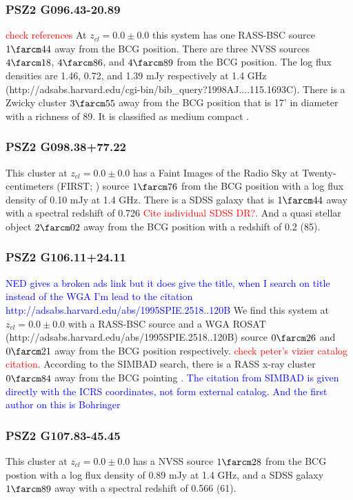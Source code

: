 \documentclass[apj, revtex4-1]{emulateapj}
\newcommand{\editorial}[1]{\textcolor{red}{#1}}
\newcommand{\peditorial}[1]{\textcolor{blue}{#1}}
\begin{document}
\subsubsection{PSZ2 G096.43-20.89}
\editorial{check references}
At $z_{cl} = 0.0 \pm 0.0$ this system has one RASS-BSC source $1\farcm44$ away from the BCG position. There are three NVSS sources $4\farcm18$, $4\farcm86$, and $4\farcm89$ from the BCG position. The log flux densities are 1.46, 0.72, and 1.39 mJy respectively at 1.4 GHz (http://adsabs.harvard.edu/cgi-bin/bib_query?1998AJ....115.1693C). There is a Zwicky cluster $3\farcm55$ away from the BCG position that is 17' in diameter with a richness of 89. It is classified as medium compact \citep{Zwicky1968}.

\subsubsection{PSZ2 G098.38+77.22}
This cluster at $z_{cl} = 0.0 \pm 0.0$ has a Faint Images of the Radio Sky at Twenty-centimeters (FIRST; \citealt{Becker1995}) source $1\farcm76$ from the BCG position with a log flux density of 0.10 mJy at 1.4 GHz. There is a SDSS galaxy that is $1\farcm44$ away with a spectral redshift of 0.726 \editorial{Cite individual SDSS DR?}. And a quasi stellar object $2\farcm02$ away from the BCG position with a redshift of 0.2 (85). 

\subsubsection{PSZ2 G106.11+24.11}
\peditorial{NED gives a broken ads link but it does give the title, when I search on title instead of the WGA I'm lead to the citation http://adsabs.harvard.edu/abs/1995SPIE.2518..120B}
We find this system at $z_{cl} = 0.0 \pm 0.0$ with a RASS-BSC source and a WGA ROSAT (http://adsabs.harvard.edu/abs/1995SPIE.2518..120B) source $0\farcm26$ and $0\farcm21$ away from the BCG position respectively. \editorial{check peter's vizier catalog citation.} According to the SIMBAD search, there is a RASS x-ray cluster $0\farcm84$ away from the BCG pointing \citep{Bohringer2000}. \peditorial{The citation from SIMBAD is given directly with the ICRS coordinates, not form external catalog. And the first author on this is Bohringer}


\subsubsection{PSZ2 G107.83-45.45}
This cluster at $z_{cl} = 0.0 \pm 0.0$ has a NVSS source $1\farcm28$ from the BCG postion with a log flux density of 0.89 mJy at 1.4 GHz, and a SDSS galaxy $1\farcm89$ away with a spectral redshift of 0.566 (61).
\end{document}
